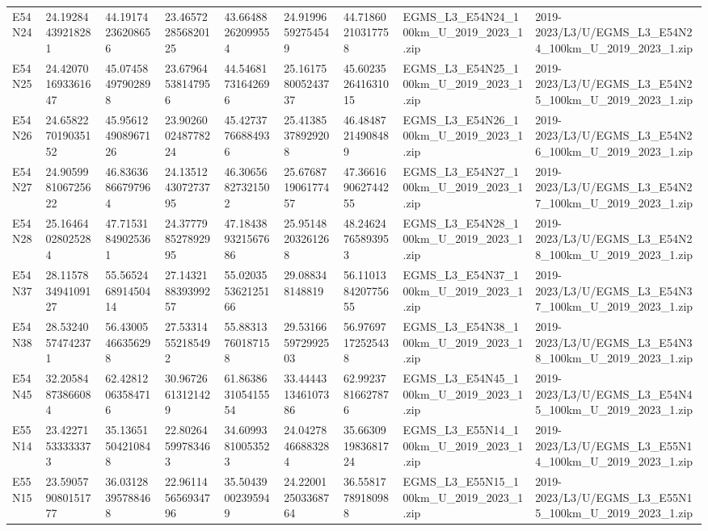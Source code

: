 \begin{landscape}
\begin{longtable}{lllllllll}
E54N24 & 24.19284439218281 & 44.19174236208656 & 23.465722856820125 & 43.66488262099554 & 24.91996592754549 & 44.71860210317758 & EGMS\_L3\_E54N24\_100km\_U\_2019\_2023\_1.zip & 2019-2023/L3/U/EGMS\_L3\_E54N24\_100km\_U\_2019\_2023\_1.zip \\
E54N25 & 24.420701693361647 & 45.07458497902898 & 23.67964538147956 & 44.54681731642696 & 25.161758005243737 & 45.602352641631015 & EGMS\_L3\_E54N25\_100km\_U\_2019\_2023\_1.zip & 2019-2023/L3/U/EGMS\_L3\_E54N25\_100km\_U\_2019\_2023\_1.zip \\
E54N26 & 24.658227019035152 & 45.956124908967126 & 23.902600248778224 & 45.42737766884936 & 25.41385378929208 & 46.48487214908489 & EGMS\_L3\_E54N26\_100km\_U\_2019\_2023\_1.zip & 2019-2023/L3/U/EGMS\_L3\_E54N26\_100km\_U\_2019\_2023\_1.zip \\
E54N27 & 24.905998106725622 & 46.83636866797964 & 24.135124307273795 & 46.30656827321502 & 25.676871906177457 & 47.366169062744255 & EGMS\_L3\_E54N27\_100km\_U\_2019\_2023\_1.zip & 2019-2023/L3/U/EGMS\_L3\_E54N27\_100km\_U\_2019\_2023\_1.zip \\
E54N28 & 25.16464028025284 & 47.71531849025361 & 24.377798527892995 & 47.184389321567686 & 25.95148203261268 & 48.24624765893953 & EGMS\_L3\_E54N28\_100km\_U\_2019\_2023\_1.zip & 2019-2023/L3/U/EGMS\_L3\_E54N28\_100km\_U\_2019\_2023\_1.zip \\
E54N37 & 28.115783494109127 & 55.565246891450414 & 27.143218839399257 & 55.020355362125166 & 29.088348148819 & 56.110138420775655 & EGMS\_L3\_E54N37\_100km\_U\_2019\_2023\_1.zip & 2019-2023/L3/U/EGMS\_L3\_E54N37\_100km\_U\_2019\_2023\_1.zip \\
E54N38 & 28.53240574742371 & 56.43005466356298 & 27.53314552185492 & 55.88313760187158 & 29.531665972992503 & 56.97697172525438 & EGMS\_L3\_E54N38\_100km\_U\_2019\_2023\_1.zip & 2019-2023/L3/U/EGMS\_L3\_E54N38\_100km\_U\_2019\_2023\_1.zip \\
E54N45 & 32.20584873866084 & 62.42812063584716 & 30.96726613121429 & 61.863863105415554 & 33.444431346107386 & 62.99237816627876 & EGMS\_L3\_E54N45\_100km\_U\_2019\_2023\_1.zip & 2019-2023/L3/U/EGMS\_L3\_E54N45\_100km\_U\_2019\_2023\_1.zip \\
E55N14 & 23.42271533333373 & 35.13651504210848 & 22.80264599783463 & 34.60993810053523 & 24.04278466883284 & 35.663091983681724 & EGMS\_L3\_E55N14\_100km\_U\_2019\_2023\_1.zip & 2019-2023/L3/U/EGMS\_L3\_E55N14\_100km\_U\_2019\_2023\_1.zip \\
E55N15 & 23.590579080151777 & 36.03128395788468 & 22.961145656934796 & 35.50439002395949 & 24.220012503368764 & 36.55817789180988 & EGMS\_L3\_E55N15\_100km\_U\_2019\_2023\_1.zip & 2019-2023/L3/U/EGMS\_L3\_E55N15\_100km\_U\_2019\_2023\_1.zip \\

\end{longtable}
\end{landscape}
